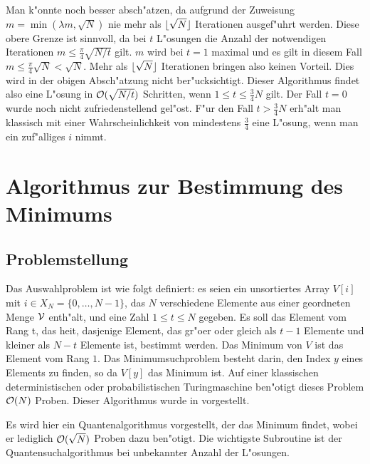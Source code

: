               Man k"onnte noch besser absch"atzen, da aufgrund der Zuweisung $m=\min(\lambda m, \sqrt{N})$ nie mehr als $\lfloor \sqrt{N} \rfloor$ Iterationen 
              ausgef"uhrt werden. Diese obere Grenze ist sinnvoll, da bei $t$ L"osungen die Anzahl der notwendigen Iterationen $m\le\frac{\pi}{4}\sqrt{N/t}$
              gilt. $m$ wird bei $t=1$ maximal und es gilt in diesem Fall $m\le\frac{\pi}{4}\sqrt{N} < \sqrt{N}$. Mehr als $\lfloor \sqrt{N} \rfloor$ Iterationen bringen also keinen 
              Vorteil.
              Dies wird in der obigen Absch"atzung nicht ber"ucksichtigt. Dieser Algorithmus findet also eine L"osung in ${\cal O}( \sqrt{N/t})$ Schritten, 
              wenn $1\le t \le \frac{3}{4}N$ gilt. 
              Der Fall $t=0$ wurde noch nicht zufriedenstellend gel"ost.
              F"ur den Fall $t>\frac{3}{4}N$ erh"alt man klassisch mit einer Wahrscheinlichkeit von mindestens $\frac{3}{4}$ eine L"osung, wenn man ein zuf"alliges $i$ nimmt.

     \section{Algorithmus zur Bestimmung des Minimums} 
       \subsection{Problemstellung}
         Das Auswahlproblem ist wie folgt definiert: es seien ein unsortiertes Array $V[i]$ mit $i\in X_N=\{0,\ldots,N-1\}$, das $N$ verschiedene Elemente aus einer
         geordneten Menge ${\cal V}$ enth"alt, und eine Zahl $1\le t\le N$ gegeben. Es soll das Element vom Rang t, das hei\3t, dasjenige Element, das gr"o\3er oder gleich als
         $t-1$ Elemente und kleiner als $N-t$ Elemente ist, bestimmt werden. Das Minimum von  $V$ ist das Element vom Rang $1$. Das Minimumsuchproblem besteht darin, den Index $y$ 
         eines Elements zu finden, so da\3 $V[y]$ das Minimum ist. Auf einer klassischen deterministischen oder probabilistischen Turingmaschine ben"otigt dieses Problem 
         ${\cal O}(N)$ Proben. Dieser Algorithmus wurde in \cite{hoyermin} vorgestellt.

         Es wird hier ein Quantenalgorithmus vorgestellt, der das Minimum findet, wobei er lediglich ${\cal O}(\sqrt{N})$ Proben dazu ben"otigt. Die wichtigste
         Subroutine ist der Quantensuchalgorithmus bei unbekannter Anzahl der L"osungen.
